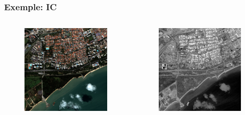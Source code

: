 \documentclass[compress,handout]{beamer}
\begin{document}
\begin{frame}
\frametitle{Exemple: IC}
\begin{columns}
\begin{column}{0.5\textwidth}
\begin{figure}[]
  \includegraphics[width=1.0\textwidth]{radio2-extract-3b.jpg}
\end{figure}
\end{column}
\begin{column}{0.5\textwidth}
\begin{figure}[]
  \includegraphics[width=1.0\textwidth]{Radiometry-IC.jpg}
\end{figure}
\end{column}
\end{columns}
\end{frame}
\end{document}
